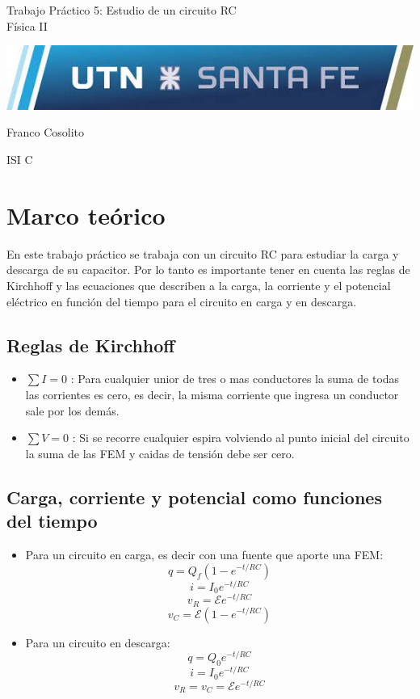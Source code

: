 \documentclass[11pt, letterpaper]{article}
\newcommand\vspt{15pt}
\newcommand\tpn{5}
\newcommand\tptitle{Estudio de un circuito RC}
\newcommand\tpsubj{Física II}
\begin{document}
\thispagestyle{empty}

\begin{center}\Huge{Trabajo Práctico \tpn: \tptitle\\
\vspace{\vspt}
\tpsubj}\end{center}

\vspace{\vspt}
\includegraphics[width=\linewidth]{utnlogo}

\vspace{\vspt}
\begin{center}\Huge{Franco Cosolito}\end{center}

\vspace{\vspt}
\begin{center}\Large{ISI C}\end{center}
\pagebreak

\setcounter{page}{1}

\section{Marco teórico}
En este trabajo práctico se trabaja con un circuito RC para estudiar la carga
y descarga de su capacitor. Por lo tanto es importante tener en cuenta las
reglas de Kirchhoff y las ecuaciones que describen a la carga, la corriente
y el potencial eléctrico en función del tiempo para el circuito en carga y
en descarga.
\subsection{Reglas de Kirchhoff}
\begin{itemize}
    \item $\sum I = 0$ : Para cualquier unior de tres o mas conductores la suma
       de todas las corrientes es cero, es decir, la misma corriente que ingresa
       un conductor sale por los demás.
    \item $\sum V = 0$ : Si se recorre cualquier espira volviendo al punto inicial
        del circuito la suma de las FEM y caidas de tensión debe ser cero.
\end{itemize}
\subsection{Carga, corriente y potencial como funciones del tiempo}
\begin{itemize}
    \item Para un circuito en carga, es decir con una fuente que aporte una FEM:
        $$q=Q_f(1-e^{-t/RC})$$ 
        $$i=I_0e^{-t/RC}$$ 
        $$v_R=\mathcal{E} e^{-t/RC}$$
        $$v_C=\mathcal{E} (1-e^{-t/RC})$$
    \item Para un circuito en descarga:
        $$q=Q_0e^{-t/RC}$$ 
        $$i=I_0e^{-t/RC}$$ 
        $$v_R=v_C=\mathcal{E} e^{-t/RC}$$ 
\end{itemize}
        
\end{document}

